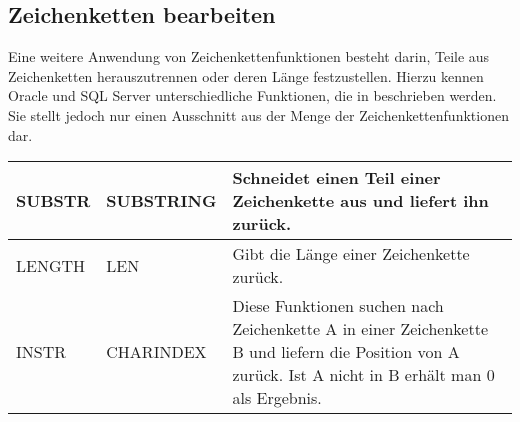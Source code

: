 \subsection{Zeichenketten bearbeiten}
Eine weitere Anwendung von Zeichenkettenfunktionen besteht darin, Teile aus Zeichenketten herauszutrennen oder deren Länge festzustellen. Hierzu kennen Oracle und SQL Server unterschiedliche Funktionen, die in  beschrieben werden. Sie stellt jedoch nur einen Ausschnitt aus der Menge der Zeichenkettenfunktionen dar.
\begin{center}
    \label{srfstringfct2}
    \begin{small}
        \tabletail{
            \hline
        }
        \tablelasttail {
            \hline
        }
        \begin{supertabular}{|l|l|p{10cm}|}
            SUBSTR & SUBSTRING &  Schneidet einen Teil einer Zeichenkette aus und liefert ihn zurück. \\
            \hline
            LENGTH & LEN &  Gibt die Länge einer Zeichenkette zurück. \\
            \hline
            INSTR & CHARINDEX & Diese Funktionen suchen nach Zeichenkette A in
            einer Zeichenkette B und liefern die Position von A zurück. Ist
            A nicht in B erhält man 0 als Ergebnis. \\
        \end{supertabular}
    \end{small}
\end{center}
